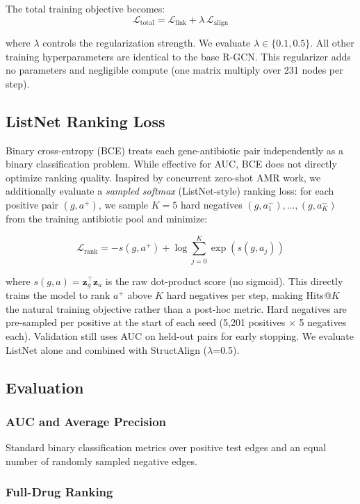 \documentclass[conference]{IEEEtran}
\begin{document}
The total training objective becomes:
$$\mathcal{L}_{\text{total}} = \mathcal{L}_{\text{link}} + \lambda\,\mathcal{L}_{\text{align}}$$

where $\lambda$ controls the regularization strength. We evaluate $\lambda \in \{0.1, 0.5\}$. All other training hyperparameters are identical to the base R-GCN. This regularizer adds no parameters and negligible compute (one matrix multiply over 231 nodes per step).

\subsection{ListNet Ranking Loss}
\label{sec:listnet}

Binary cross-entropy (BCE) treats each gene-antibiotic pair independently as a binary classification problem. While effective for AUC, BCE does not directly optimize ranking quality. Inspired by concurrent zero-shot AMR work, we additionally evaluate a \textit{sampled softmax} (ListNet-style) ranking loss: for each positive pair $(g, a^+)$, we sample $K=5$ hard negatives $(g, a_1^-), \ldots, (g, a_K^-)$ from the training antibiotic pool and minimize:

$$\mathcal{L}_{\text{rank}} = -s(g, a^+) + \log\!\sum_{j=0}^{K} \exp(s(g, a_j))$$

where $s(g, a) = \mathbf{z}_g^\top \mathbf{z}_a$ is the raw dot-product score (no sigmoid). This directly trains the model to rank $a^+$ above $K$ hard negatives per step, making Hits@$K$ the natural training objective rather than a post-hoc metric. Hard negatives are pre-sampled per positive at the start of each seed (5,201 positives $\times$ 5 negatives each). Validation still uses AUC on held-out pairs for early stopping. We evaluate ListNet alone and combined with StructAlign ($\lambda$=0.5).

\subsection{Evaluation}

\subsubsection{AUC and Average Precision}

Standard binary classification metrics over positive test edges and an equal number of randomly sampled negative edges.

\subsubsection{Full-Drug Ranking}
\end{document}
